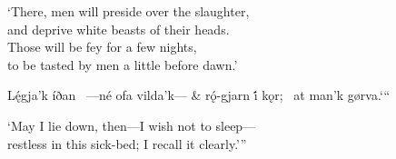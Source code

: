 \bvb\speakernoteb{[Guthrun:]}%
‘There, men will preside over the slaughter, \\
and deprive white beasts of their heads. \\
Those will be fey for a few nights, \\
to be tasted by men a little before dawn.’\evb\evg


\bvg\bva%
\speakernote{[Atli:]}%
Lę́gja’k íðan \hld\ ---né ofa vilda’k--- &
rǫ́-gjarn i̇́ kǫr; \hld\ at man’k gørva.‘“\eva

\bvb\speakernoteb{[Attle:]}%
‘May I lie down, then---I wish not to sleep--- \\
restless in this sick-bed; I recall it clearly.’”\evb\evg


\sectionline
